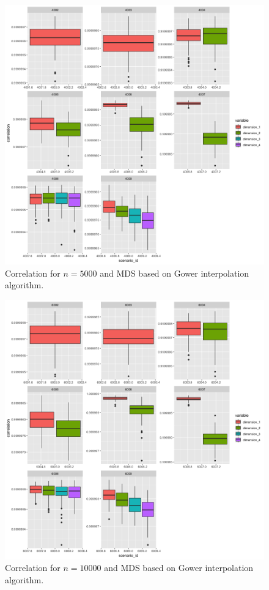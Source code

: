 \documentclass[11pt]{report}
\begin{document}
\begin{figure}[ht]
\centering
    \includegraphics[scale = 1.5]{./images/gower_correlation_5000.png}
    \caption{Correlation for $n = 5000$ and MDS based on Gower interpolation algorithm.}
    \label{gower_correlation_5000}
\end{figure}

\begin{figure}[ht]
\centering
    \includegraphics[scale = 1.5]{./images/gower_correlation_10000.png}
    \caption{Correlation for $n = 10000$ and MDS based on Gower interpolation algorithm.}
    \label{gower_correlation_10000}
\end{figure}
\end{document}
